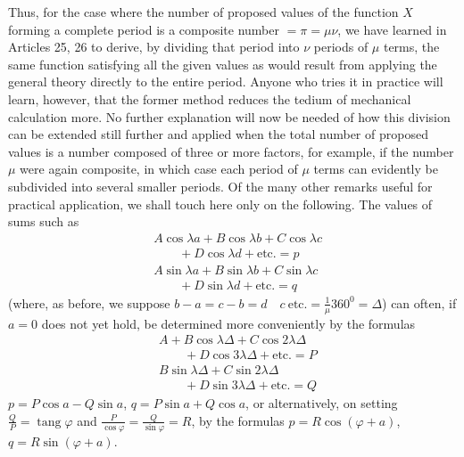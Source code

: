 \begingroup
\renewcommand{\arraystretch}{1.45}
Thus, for the case where the number of proposed values of the function $X$ forming a complete period is a composite number $=\pi=\mu\nu$, we have learned in Articles 25, 26 to derive, by dividing that period into $\nu$ periods of $\mu$ terms, the same function satisfying all the given values as would result from applying the general theory directly to the entire period. Anyone who tries it in practice will learn, however, that the former method reduces the tedium of mechanical calculation more. No further explanation will now be needed of how this division can be extended still further and applied when the total number of proposed values is a number composed of three or more factors, for example, if the number $\mu$
were again composite, in which case each period of $\mu$ terms can evidently be subdivided into several smaller periods. Of the many other remarks useful for practical application, we shall touch here only on the following. The values of sums such as
\[
\begin{aligned}
&A\cos\lambda a+B\cos\lambda b+C\cos\lambda c\\[5pt]
&\qquad{}+D\cos\lambda d+\text{etc.}=p\\[5pt]
&A\sin\lambda a+B\sin\lambda b+C\sin\lambda c\\[5pt]
&\qquad{}+D\sin\lambda d+\text{etc.}=q
\end{aligned}
\]
(where, as before, we suppose $b-a=c-b=d\quad c\ \text{etc.}=\tfrac1\mu360^{\mathord{0}}=\Delta$)
can often, if $a=0$ does not yet hold, be determined more conveniently by the formulas
\[
\begin{aligned}
&A+B\cos\lambda\Delta+C\cos2\lambda\Delta\\[5pt]
&\qquad{}+D\cos3\lambda\Delta+\text{etc.}=P\\[5pt]
&B\sin\lambda\Delta+C\sin2\lambda\Delta\\[5pt]
&\qquad{}+D\sin3\lambda\Delta+\text{etc.}=Q
\end{aligned}
\]
$p=P\cos a-Q\sin a$, $q=P\sin a+Q\cos a$, or alternatively, on setting
$\frac QP=\operatorname{tang}\varphi$ and $\frac P{\cos\varphi}=\frac Q{\sin\varphi}=R$,
\hfill\break{}by the formulas $p=R\cos(\varphi+a)$, $q=R\sin(\varphi+a)$.

\endgroup

